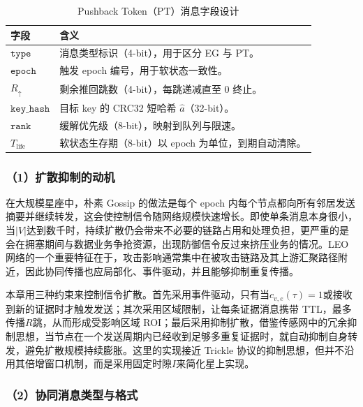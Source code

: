 \begin{table}[t]
\centering
\caption{Pushback Token（PT）消息字段设计}
\label{tab:pt_format}
\small
\begin{tabular}{@{}
>{\raggedright\arraybackslash}p{3.4cm}
>{\raggedright\arraybackslash}p{8.1cm}
@{}}
\toprule
\textbf{字段} & \textbf{含义} \\
\midrule
$\texttt{type}$ & 消息类型标识（4-bit），用于区分 EG 与 PT。 \\

$\texttt{epoch}$ & 触发 epoch 编号，用于软状态一致性。 \\

$R_{\uparrow}$ & 剩余推回跳数（4-bit），每跳递减直至 0 终止。 \\

$\texttt{key\_hash}$ & 目标 key 的 CRC32 短哈希 $\widehat{a}$（32-bit）。 \\

$\texttt{rank}$ & 缓解优先级（8-bit），映射到队列与限速。 \\

$T_{\text{life}}$ & 软状态生存期（8-bit）以 epoch 为单位，到期自动清除。 \\
\bottomrule
\end{tabular}
\end{table}

\subsubsection*{（1）扩散抑制的动机}
在大规模星座中，朴素 Gossip 的做法是每个 epoch 内每个节点都向所有邻居发送摘要并继续转发，这会使控制信令随网络规模快速增长。即使单条消息本身很小，当$|V|$达到数千时，持续扩散仍会带来不必要的链路占用和处理负担，更严重的是会在拥塞期间与数据业务争抢资源，出现防御信令反过来挤压业务的情况。LEO 网络的一个重要特征在于，攻击影响通常集中在被攻击链路及其上游汇聚路径附近，因此协同传播也应局部化、事件驱动，并且能够抑制重复传播。

本章用三种约束来控制信令扩散。首先采用事件驱动，只有当$c_{v,e}(\tau)=1$或接收到新的证据时才触发发送；其次采用区域限制，让每条证据消息携带 TTL，最多传播$R$跳，从而形成受影响区域 ROI；最后采用抑制扩散，借鉴传感网中的冗余抑制思想，当节点在一个发送周期内已经收到足够多重复证据时，就自动抑制自身转发，避免扩散规模持续膨胀。这里的实现接近 Trickle 协议的抑制思想，但并不沿用其倍增窗口机制，而是采用固定时隙$I$来简化星上实现。

\subsubsection*{（2）协同消息类型与格式}

